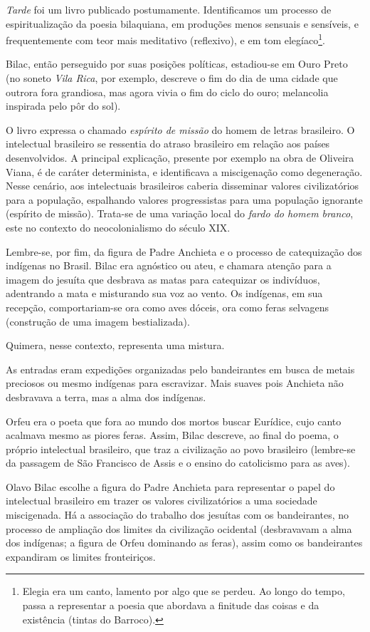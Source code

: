 \textit{Tarde} foi um livro publicado postumamente. Identificamos um processo de espiritualização da poesia bilaquiana, em produções menos sensuais e sensíveis, e frequentemente com teor mais meditativo (reflexivo), e em tom elegíaco\footnote{Elegia era um canto, lamento por algo que se perdeu. Ao longo do tempo, passa a representar a poesia que abordava a finitude das coisas e da existência (tintas do Barroco).}. 

Bilac, então perseguido por suas posições políticas, estadiou-se em Ouro Preto (no soneto \textit{Vila Rica}, por exemplo, descreve o fim do dia de uma cidade que outrora fora grandiosa, mas agora vivia o fim do ciclo do ouro; melancolia inspirada pelo pôr do sol).

O livro expressa o chamado \textit{espírito de missão} do homem de letras brasileiro. O intelectual brasileiro se ressentia do atraso brasileiro em relação aos países desenvolvidos. A principal explicação, presente por exemplo na obra de Oliveira Viana, é de caráter determinista, e identificava a miscigenação como degeneração. Nesse cenário, aos intelectuais brasileiros caberia disseminar valores civilizatórios para a população, espalhando valores progressistas para uma população ignorante (espírito de missão). Trata-se de uma variação local do \textit{fardo do homem branco}, este no contexto do neocolonialismo do século XIX.

Lembre-se, por fim, da figura de Padre Anchieta e o processo de catequização dos indígenas no Brasil. Bilac era agnóstico ou ateu, e chamara atenção para a imagem do jesuíta que desbrava as matas para catequizar os indivíduos, adentrando a mata e misturando sua voz ao vento. Os indígenas, em sua recepção, comportariam-se ora como aves dóceis, ora como feras selvagens (construção de uma imagem bestializada).

Quimera, nesse contexto, representa uma mistura.

As entradas eram expedições organizadas pelo bandeirantes em busca de metais preciosos ou mesmo indígenas para escravizar. Mais suaves pois Anchieta não desbravava a terra, mas a alma dos indígenas.

Orfeu era o poeta que fora ao mundo dos mortos buscar Eurídice, cujo canto acalmava mesmo as piores feras. Assim, Bilac descreve, ao final do poema, o próprio intelectual brasileiro, que traz a civilização ao povo brasileiro (lembre-se da passagem de São Francisco de Assis e o ensino do catolicismo para as aves).

Olavo Bilac escolhe a figura do Padre Anchieta para representar o papel do intelectual brasileiro em trazer os valores civilizatórios a uma sociedade miscigenada. Há a associação do trabalho dos jesuítas com os bandeirantes, no processo de ampliação dos limites da civilização ocidental (desbravavam a alma dos indígenas; a figura de Orfeu dominando as feras), assim como os bandeirantes expandiram os limites fronteiriços.

